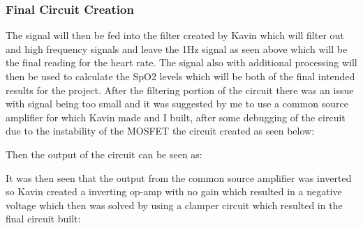 \documentclass{article}
\begin{document}
\subsubsection{Final Circuit Creation}
The signal will then be fed into the filter created by Kavin which will filter out and high frequency signals and leave the 1Hz signal as seen above which will be the final reading for the heart rate. The signal also with additional processing will then be used to calculate the SpO2 levels which will be both of the final intended results for the project. After the filtering portion of the circuit there was an issue with signal being too small and it was suggested by me to use a common source amplifier for which Kavin made and I built, after some debugging of the circuit due to the instability of the MOSFET the circuit created as seen below:
\begin{center}
\end{center}
Then the output of the circuit can be seen as:
\begin{center}
\end{center}
\newpage
It was then seen that the output from the common source amplifier was inverted so Kavin created a inverting op-amp with no gain which resulted in a negative voltage which then was solved by using a clamper circuit which resulted in the final circuit built:
\end{document}
